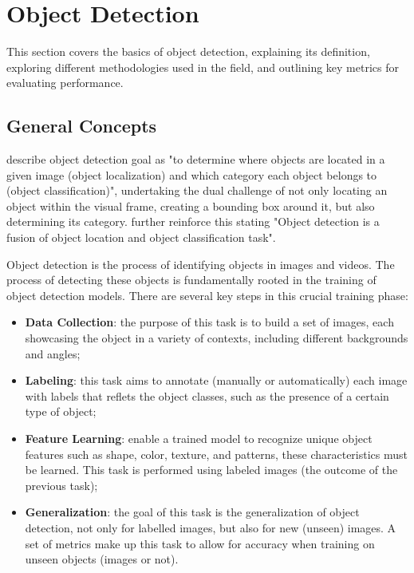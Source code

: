 \section{Object Detection}
This section covers the basics of object detection, explaining its definition, exploring different methodologies 
used in the field, and outlining key metrics for evaluating performance.
\subsection{General Concepts}
\citet{rfc2} describe object detection goal as "to determine where objects are located in a given image (object localization) and which category each object belongs to (object classification)", undertaking the dual challenge of not only locating an object within the visual frame, creating a bounding box around it, but also determining its category. \citet{rfc9} further reinforce this stating "Object detection is a fusion of object location and object classification task".


Object detection is the process of identifying objects in images and videos. The process of 
detecting these objects is fundamentally rooted in the training of object detection models.
There are several key steps in this crucial training phase:
\begin{itemize}
    \item \textbf{Data Collection}: the purpose of this task is to build a set of images, each showcasing the object 
    in a variety of contexts, including different backgrounds and angles;
    \item \textbf{Labeling}: this task aims to annotate (manually or automatically) each image with labels that reflets 
    the object classes, such as the presence of a certain type of object;
    \item \textbf{Feature Learning}: enable a trained model to recognize unique object features such as shape, color, 
    texture, and patterns, these characteristics must be learned. This task is performed using labeled images 
    (the outcome of the previous task);
    \item \textbf{Generalization}: the goal of this task is the generalization of object detection, not only for 
    labelled images, but also for new (unseen) images. A set of metrics make up this task to allow for accuracy 
    when training on unseen objects (images or not). 
\end{itemize} 

